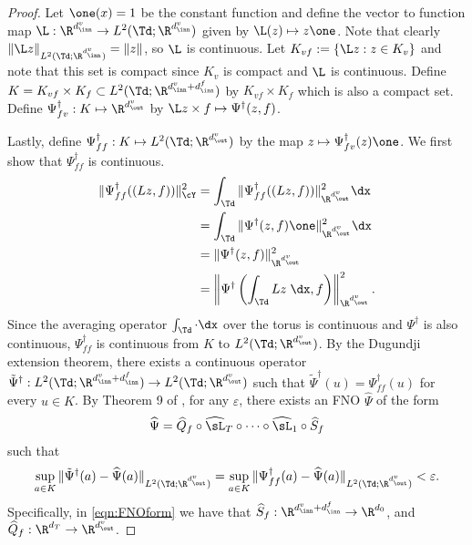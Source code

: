 \documentclass[letterpaper,11pt]{article}
\begin{document}
\begin{proof}
   Let $\one(x) = 1$ be the constant function and define the vector to function map $\L: \R^{d_{\inn}^{v}} \to L^2(\Td;\R^{d_{\inn}^{v}})$ given by $\L(z) \mapsto z\one$. Note that clearly $\|\L z\|_{L^2(\Td;\R^{d_{\inn}^{v}})} = \|z\|$, so $\L$ is continuous. Let $K_{vf}: = \{\L z: z \in K_v\}$ and note that this set is compact since $K_v$ is compact and $\L$ is continuous. Define $K = K_{vf} \times K_f \subset L^2(\Td; \R^{d_{\inn}^{v} + d_{\inn}^f})$ by $K_{vf} \times K_f$ which is also a compact set. Define $\Psi_{fv}^\dagger: K \mapsto \R^{d_{\out}^{v}}$ by $\L z \times f \mapsto \Psi^\dagger(z,f)$. 

    Lastly, define $\Psi_{ff}^\dagger: K \mapsto L^2(\Td; \R^{d_{\out}^{v}})$ by the map $z \mapsto \Psi_{fv}^\dagger(z)\one$. We first show that $\Psi_{ff}^\dagger$ is continuous. 
    \begin{align*}
        \|\Psi^\dagger_{ff}((Lz, f))\|^2_{\cY} & = \int_{\Td} \|\Psi^\dagger_{ff}((Lz, f))\|_{\R^{d_{\out}^{v}}}^2 \dx \\
        & = \int_{\Td}\|\Psi^\dagger(z,f)\one\|_{\R^{d_{\out}^{v}}}^2 \dx \\
        & = \|\Psi^\dagger(z,f)\|_{\R^{d_{\out}^{v}}}^2 \\
        & = \left\|\Psi^\dagger\left(\int_{\Td}Lz \; \dx, f\right)\right\|^2_{\R^{d_{\out}^{v}}}.
    \end{align*}
    Since the averaging operator $\int_{\Td} \cdot \dx$ over the torus is continuous and $\Psi^{\dagger}$ is also continuous, $\Psi^\dagger_{ff}$ is continuous from $K$ to $L^2(\Td; \R^{d_{\out}^{v}})$. 
    By the Dugundji extension theorem, there exists a continuous operator $\tilde{\Psi}^\dagger: L^2(\Td; \R^{d_{\inn}^{v} + d_{\inn}^f}) \to L^2(\Td; \R^{d_{\out}^{v}})$ such that $\tilde{\Psi}^\dagger(u) = \Psi_{ff}^\dagger(u)$ for every $u \in K$. By Theorem 9 of \cite{kovachki2021universal}, for any $\varepsilon$, there exists an FNO $\widehat{\Psi}$ of the form 
    \begin{equation}\label{eqn:FNOform}
        \widehat{\Psi} = \widehat{Q}_f \circ \widehat{\sL}_T \circ \dots \circ \widehat{\sL}_1 \circ \widehat{S}_f
    \end{equation}
    such that 
    \begin{equation}\label{eqn:FNOapprox}
    \sup_{a \in K} \|\tilde{\Psi}^\dagger(a)- \widehat{\Psi}(a)\|_{L^2(\Td;\R^{d_{\out}^{v}})} = \sup_{a \in K} \|\Psi_{ff}^\dagger(a)- \widehat{\Psi}(a)\|_{L^2(\Td;\R^{d_{\out}^{v}})} < \varepsilon.
    \end{equation}
    Specifically, in \ref{eqn:FNOform} we have that $\widehat{S}_f: \R^{d_{\inn}^{v}+d_{\inn}^f} \to \R^{d_0}$, and $\widehat{Q}_f: \R^{d_T} \to \R^{d_{\out}^{v}}$. 


\end{proof}
\end{document}
